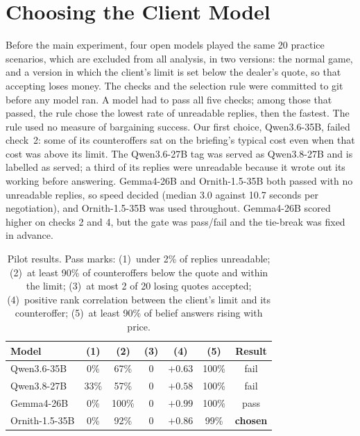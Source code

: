 \documentclass[sigconf]{acmart}
\begin{document}
\section{Choosing the Client Model}
\label{app:pilot}
Before the main experiment, four open models played the same 20 practice scenarios, which are excluded from all analysis, in two versions: the normal game, and a version in which the client's limit is set below the dealer's quote, so that accepting loses money. The checks and the selection rule were committed to git before any model ran. A model had to pass all five checks; among those that passed, the rule chose the lowest rate of unreadable replies, then the fastest. The rule used no measure of bargaining success. Our first choice, Qwen3.6-35B, failed check~2: some of its counteroffers sat on the briefing's typical cost even when that cost was above its limit. The Qwen3.6-27B tag was served as Qwen3.8-27B and is labelled as served; a third of its replies were unreadable because it wrote out its working before answering. Gemma4-26B and Ornith-1.5-35B both passed with no unreadable replies, so speed decided (median 3.0 against 10.7 seconds per negotiation), and Ornith-1.5-35B was used throughout. Gemma4-26B scored higher on checks 2 and 4, but the gate was pass/fail and the tie-break was fixed in advance.

\begin{table}[ht]
  \small
  \caption{Pilot results. Pass marks: (1)~under 2\% of replies unreadable; (2)~at least 90\% of counteroffers below the quote and within the limit; (3)~at most 2 of 20 losing quotes accepted; (4)~positive rank correlation between the client's limit and its counteroffer; (5)~at least 90\% of belief answers rising with price.}
  \label{tab:pilot}
  \begin{tabular}{@{}lcccccc@{}}
    \toprule
    Model & (1) & (2) & (3) & (4) & (5) & Result \\
    \midrule
    Qwen3.6-35B    & 0\%  & 67\%  & 0 & $+0.63$ & 100\% & fail \\
    Qwen3.8-27B    & 33\% & 57\%  & 0 & $+0.58$ & 100\% & fail \\
    Gemma4-26B     & 0\%  & 100\% & 0 & $+0.99$ & 100\% & pass \\
    Ornith-1.5-35B & 0\%  & 92\%  & 0 & $+0.86$ & 99\%  & \textbf{chosen} \\
    \bottomrule
  \end{tabular}
\end{table}
\end{document}
